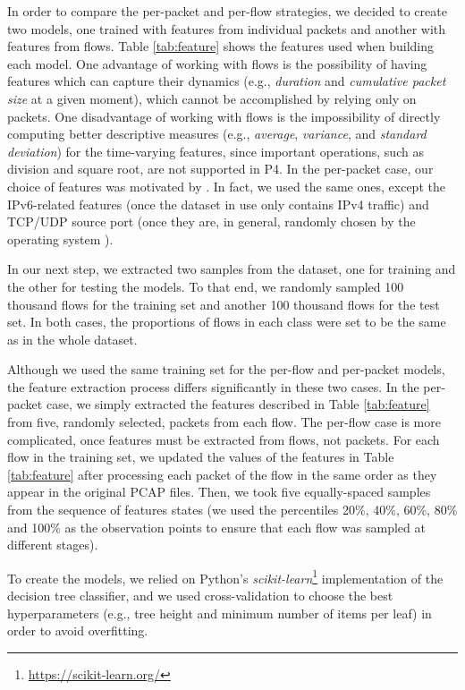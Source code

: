 In order to compare the per-packet and per-flow strategies, we decided to create two models, one trained with features from individual packets and another with features from flows. 
Table \ref{tab:feature} shows the features used when building each model. One advantage of working with flows is the possibility of having features which can capture their dynamics (e.g., \emph{duration} and \emph{cumulative packet size} at a given moment), which cannot be accomplished by relying only on packets. One disadvantage of working with flows is the impossibility of directly computing better descriptive measures (e.g., \emph{average}, \emph{variance}, and \emph{standard deviation}) for the time-varying features, since important operations, such as division and square root, are not supported in P4. 
In the per-packet case, our choice of features was motivated by \cite{xiong2019switches}. In fact, we used the same ones, except the IPv6-related features (once the dataset in use only contains IPv4 traffic) and TCP/UDP source port (once they are, in general, randomly chosen by the operating system \cite{larsen2011recommendations}).


In our next step, we extracted two samples from the dataset, one for training and the other for testing the models. To that end, we randomly sampled 100 thousand flows for the training set and another 100 thousand flows for the test set. In both cases, the proportions of flows in each class were set to be the same as in the whole dataset.

Although we used the same training set for the per-flow and per-packet models, the feature extraction process differs significantly in these two cases.
In the per-packet case, we simply extracted the features described in Table \ref{tab:feature} from five, randomly selected, packets from each flow.
The per-flow case is more complicated, once features must be extracted from flows, not packets. For each flow in the training set, we updated the values of the features in Table \ref{tab:feature} after processing each packet of the flow in the same order as they appear in the original PCAP files.
Then, we took five equally-spaced samples from the sequence of features states (we used the percentiles 20\%, 40\%, 60\%, 80\% and 100\% as the observation points to ensure that each flow was sampled at different stages). 

To create the models, we relied on Python's \emph{scikit-learn}\footnote{\url{https://scikit-learn.org/}} implementation of the decision tree classifier, and we used cross-validation to choose the best hyperparameters  (e.g., tree height and minimum number of items per leaf) in order to avoid overfitting.

